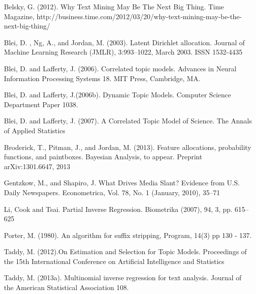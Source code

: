 \documentclass[12pt]{article}
\begin{document}


\begin{thebibliography}{99}

 Belsky, G. (2012). Why Text Mining May Be The Next Big Thing. Time Magazine, http://business.time.com/2012/03/20/why-text-mining-may-be-the-next-big-thing/

 Blei, D. , Ng, A., and Jordan, M. (2003). Latent Dirichlet allocation. Journal of Machine Learning Research (JMLR), 3:993–1022, March 2003. ISSN 1532-4435

 Blei, D. and Lafferty, J. (2006). Correlated topic models. Advances in Neural Information Processing Systems 18. MIT Press, Cambridge, MA.

 Blei, D. and Lafferty, J.(2006b). Dynamic Topic Models. Computer Science Department Paper 1038.

  Blei, D. and Lafferty, J. (2007). A Correlated Topic Model of Science. The Annals of Applied Statistics

 Broderick, T.,  Pitman, J.,  and Jordan, M. (2013). Feature allocations, probability functions, and paintboxes. Bayesian Analysis, to appear. Preprint arXiv:1301.6647, 2013

 Gentzkow, M., and  Shapiro, J. What Drives Media Slant? Evidence from U.S. Daily Newspapers. Econometrica, Vol. 78, No. 1 (January, 2010), 35–71

  Li, Cook  and Tsai. Partial Inverse Regression. Biometrika (2007), 94, 3, pp. 615–625

 Porter, M. (1980). An algorithm for suffix stripping, Program, 14(3) pp 130 - 137.

 Taddy, M. (2012).On Estimation and Selection for Topic Models.  Proceedings of the 15th International Conference on Artificial Intelligence and Statistics

 Taddy, M. (2013a). Multinomial inverse regression for text analysis. Journal of the American Statistical Association 108.


\end{thebibliography}
\end{document}
